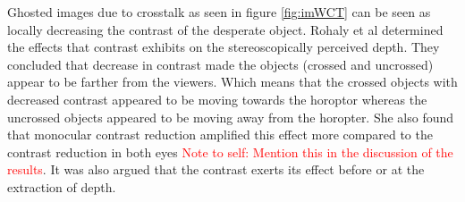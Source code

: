 Ghosted images due to crosstalk as seen in figure \ref{fig:imWCT} can be seen as locally decreasing the contrast of the desperate object. Rohaly et al \cite{rohaly1999effects} determined the effects that contrast exhibits on the stereoscopically perceived depth. They concluded that decrease in contrast made the objects (crossed and uncrossed) appear to be farther from the viewers. Which means that the crossed objects with decreased contrast appeared to be moving towards the horoptor whereas the uncrossed objects appeared to be moving away from the horopter. She also found that monocular contrast reduction amplified this effect more compared to the contrast reduction in both eyes \textcolor{red}{Note to self: Mention this in the discussion of the results}. It was also argued that the contrast exerts its effect before or at the extraction of depth.

